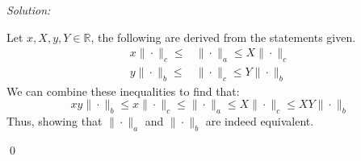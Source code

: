\documentclass[12pt]{article}
\newenvironment{problem}[2][Problem]{\begin{trivlist}
\item[\hskip \labelsep {\bfseries #1}\hskip \labelsep {\bfseries #2.}]}{\end{trivlist}}
\newenvironment{sol}
    {\emph{Solution:}
    }
    {
    \qed
    }
\newcommand{\R}{\mathbb{R}}
\begin{document}
\newpage
\begin{problem}{2}
    
\end{problem}
\begin{sol}
    Let $x, X, y, Y \in \R$, the following are derived from the statements given.
    \begin{align*}
        x \| \cdot \|_c \leq &\| \cdot \|_a \leq X \| \cdot \|_c\\
        y \| \cdot \|_b \leq &\| \cdot \|_c \leq Y \| \cdot \|_b
    \end{align*}
    We can combine these inequalities to find that:
    \[
    xy \| \cdot \|_b \leq x \| \cdot \|_c \leq \| \cdot \|_a \leq X \| \cdot \|_c \leq  XY \|\cdot\|_b
    \]
    Thus, showing that  $\| \cdot \|_a$ and $\| \cdot \|_b$ are indeed equivalent. 
\end{sol}
\end{document}
